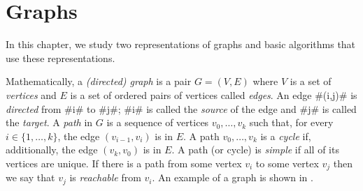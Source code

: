 \chapter{Graphs}


In this chapter, we study two representations of graphs and basic
algorithms that use these representations.  

Mathematically, a \emph{(directed) graph}
%
%
is a pair $G=(V,E)$ where
$V$ is a set of \emph{vertices}
%
and $E$ is a set of ordered pairs
of vertices called \emph{edges}.
%
An edge #(i,j)# is \emph{directed}
%
from #i# to #j#;  #i# is called the \emph{source}
 of the edge and #j#
is called the \emph{target}.
  A \emph{path}%
 in $G$ is a sequence of
vertices $v_0,\ldots,v_k$ such that, for every $i\in\{1,\ldots,k\}$,
the edge $(v_{i-1},v_{i})$ is in $E$.  A path $v_0,\ldots,v_k$ is a
\emph{cycle}
%
if, additionally, the edge $(v_k,v_0)$ is in $E$.  A path (or
cycle) is \emph{simple}
%
if all of its vertices are unique.  If there
is a path from some vertex $v_i$ to some vertex $v_j$ then we say that
$v_j$ is \emph{reachable}
 from $v_i$.  An example of a graph is shown
in .

